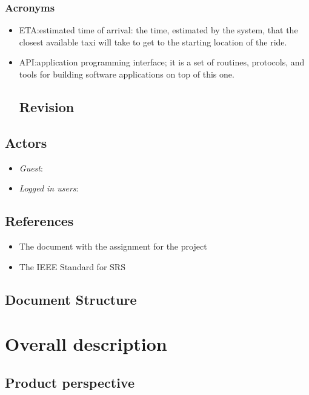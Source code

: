 \documentclass{article}
\begin{document}
\subsubsection{Acronyms}
\begin{itemize}
	\item ETA:\@ estimated time of arrival: the time, estimated by the system, that the closest available taxi will take to get to the starting location of the ride.
	\item API:\@ application programming interface; it is a set of routines, protocols, and tools for building software applications on top of this one.
	
\subsection{Revision}


	
\end{itemize}
\subsection{Actors}
\begin{itemize}
	\item \textit{Guest}: 
	\item \textit{Logged in users}:

\end{itemize}

\subsection{References}
\begin{itemize}
	\item The document with the assignment for the project
	\item The IEEE Standard for SRS 
\end{itemize}
\subsection{Document Structure}


\clearpage
\section{Overall description}

\subsection{Product perspective}

\end{document}
